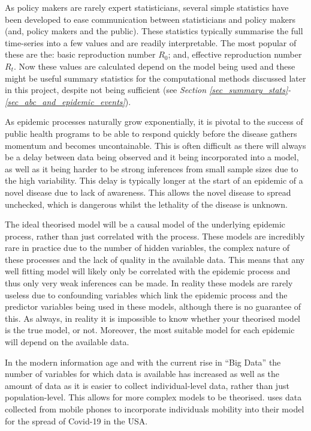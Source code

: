 \documentclass[11pt,a4paper]{article}
\theoremstyle{break}
\begin{document}
  \par As policy makers are rarely expert statisticians, several simple statistics have been developed to ease communication between statisticians and policy makers (and, policy makers and the public). These statistics typically summarise the full time-series into a few values and are readily interpretable. The most popular of these are the: basic reproduction number $R_0$; and, effective reproduction number $R_t$. Now these values are calculated depend on the model being used and these might be useful summary statistics for the computational methods discussed later in this project, despite not being sufficient (see \textit{Section \ref{sec_summary_stats}-\ref{sec_abc_and_epidemic_events}}).

  \par As epidemic processes naturally grow exponentially, it is pivotal to the success of public health programs to be able to respond quickly before the disease gathers momentum and becomes uncontainable. This is often difficult as there will always be a delay between data being observed and it being incorporated into a model, as well as it being harder to be strong inferences from small sample sizes due to the high variability. This delay is typically longer at the start of an epidemic of a novel disease due to lack of awareness. This allows the novel disease to spread unchecked, which is dangerous whilst the lethality of the disease is unknown.


  \par The ideal theorised model will be a causal model of the underlying epidemic process, rather than just correlated with the process. These models are incredibly rare in practice due to the number of hidden variables, the complex nature of these processes and the lack of quality in the available data. This means that any well fitting model will likely only be correlated with the epidemic process and thus only very weak inferences can be made. In reality these models are rarely useless due to confounding variables which link the epidemic process and the predictor variables being used in these models, although there is no guarantee of this. As always, in reality it is impossible to know whether your theorised model is the true model, or not. Moreover, the most suitable model for each epidemic will depend on the available data.

  \par In the modern information age and with the current rise in ``Big Data'' the number of variables for which data is available has increased as well as the amount of data as it is easier to collect individual-level data, rather than just population-level. This allows for more complex models to be theorised.  \cite[]{association_between_mobility_patterns_and_covid_19_transmission_in_the_usa} uses data collected from mobile phones to incorporate individuals mobility into their model for the spread of Covid-19 in the USA.
\end{document}

